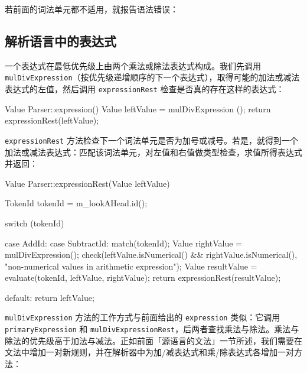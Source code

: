 若前面的词法单元都不适用，就报告语法错误：

\begin{codebox}
    default:
      syntaxError();
  }
\end{codebox}

\begin{codebox}
}
\end{codebox}

\subsection{解析语言中的表达式}

一个表达式在最低优先级上由两个乘法或除法表达式构成。我们先调用 \texttt{mulDivExpression}（按优先级递增顺序的下一个表达式），取得可能的加法或减法表达式的左值，然后调用 \texttt{expressionRest} 检查是否真的存在这样的表达式：

\begin{codebox}
Value Parser::expression() {
  Value leftValue = mulDivExpression ();
  return expressionRest(leftValue);
}
\end{codebox}

\texttt{expressionRest} 方法检查下一个词法单元是否为加号或减号。若是，就得到一个加法或减法表达式：匹配该词法单元，对左值和右值做类型检查，求值所得表达式并返回：

\begin{codebox}
Value Parser::expressionRest(Value leftValue) {
  TokenId tokenId = m_lookAHead.id();

  switch (tokenId) {
    case AddId:
    case SubtractId: {
        match(tokenId);
        Value rightValue = mulDivExpression();
        check(leftValue.isNumerical() && rightValue.isNumerical(),
              "non-numerical values in arithmetic expression");
        Value resultValue =
          evaluate(tokenId, leftValue, rightValue);
        return expressionRest(resultValue);
      }

    default:
      return leftValue;
  }
}
\end{codebox}

\texttt{mulDivExpression} 方法的工作方式与前面给出的 \texttt{expression} 类似：它调用 \texttt{primaryExpression} 和 \texttt{mulDivExpressionRest}，后两者查找乘法与除法。乘法与除法的优先级高于加法与减法。正如前面「源语言的文法」一节所述，我们需要在文法中增加一对新规则，并在解析器中为加/减表达式和乘/除表达式各增加一对方法：

